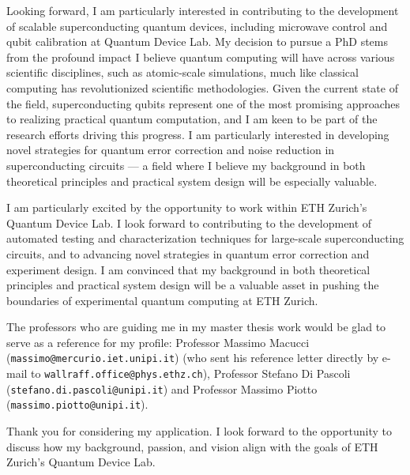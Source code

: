 \documentclass[12pt,stdletter,dateno]{newlfm}
\begin{document}
\begin{newlfm}
        Looking forward, I am particularly interested in contributing to the development of scalable superconducting quantum devices, including microwave control and qubit calibration at Quantum Device Lab. My decision to pursue a PhD stems from the profound impact I believe quantum computing will have across various scientific disciplines, such as atomic-scale simulations, much like classical computing has revolutionized scientific methodologies. Given the current state of the field, superconducting qubits represent one of the most promising approaches to realizing practical quantum computation, and I am keen to be part of the research efforts driving this progress. I am particularly interested in developing novel strategies for quantum error correction and noise reduction in superconducting circuits — a field where I believe my background in both theoretical principles and practical system design will be especially valuable.
        
        I am particularly excited by the opportunity to work within ETH Zurich’s Quantum Device Lab. I look forward to contributing to the development of automated testing and characterization techniques for large-scale superconducting circuits, and to advancing novel strategies in quantum error correction and experiment design. I am convinced that my background in both theoretical principles and practical system design will be a valuable asset in pushing the boundaries of experimental quantum computing at ETH Zurich.
        
        The professors who are guiding me in my master thesis work would be glad to serve as a reference for my profile: Professor Massimo Macucci (\texttt{massimo@mercurio.iet.unipi.it}) (who sent his reference letter directly by e-mail to \texttt{wallraff.office@phys.ethz.ch}), Professor Stefano Di Pascoli (\texttt{stefano.di.pascoli@unipi.it}) and Professor Massimo Piotto (\texttt{massimo.piotto@unipi.it}).
        
        Thank you for considering my application. I look forward to the opportunity to discuss how my background, passion, and vision align with the goals of ETH Zurich’s Quantum Device Lab.
        
    \end{newlfm}
\end{document}
